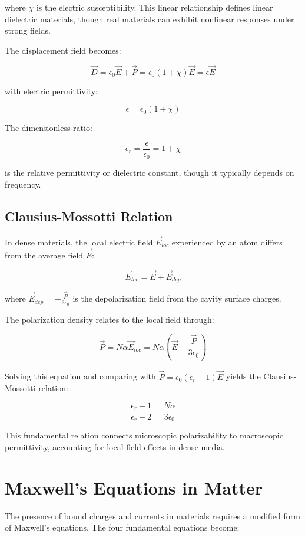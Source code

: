 \documentclass[
  a4paper,
]{book}
\begin{document}
where \(\chi\) is the electric susceptibility. This linear relationship
defines linear dielectric materials, though real materials can exhibit
nonlinear responses under strong fields.

The displacement field becomes:

\[
\vec{D}=\epsilon_0 \vec{E}+\vec{P}=\epsilon_0 (1+\chi)\vec{E}=\epsilon \vec{E}
\]

with electric permittivity:

\[
\epsilon=\epsilon_0 (1+\chi)
\tag{electric permittivity}
\]

The dimensionless ratio:

\[
\epsilon_r=\frac{\epsilon}{\epsilon_0}=1+\chi
\]

is the relative permittivity or dielectric constant, though it typically
depends on frequency.

\subsection{Clausius-Mossotti
Relation}\label{clausius-mossotti-relation}

In dense materials, the local electric field \(\vec{E}_{loc}\)
experienced by an atom differs from the average field \(\vec{E}\):

\[\vec{E}_{loc} = \vec{E} + \vec{E}_{dep}\]

where \(\vec{E}_{dep} = -\frac{\vec{P}}{3\epsilon_0}\) is the
depolarization field from the cavity surface charges.

The polarization density relates to the local field through:

\[\vec{P} = N\alpha \vec{E}_{loc} = N\alpha(\vec{E} - \frac{\vec{P}}{3\epsilon_0})\]

Solving this equation and comparing with
\(\vec{P} = \epsilon_0(\epsilon_r-1)\vec{E}\) yields the
Clausius-Mossotti relation:

\[\frac{\epsilon_r-1}{\epsilon_r+2} = \frac{N\alpha}{3\epsilon_0}\]

This fundamental relation connects microscopic polarizability to
macroscopic permittivity, accounting for local field effects in dense
media.

\section{Maxwell's Equations in
Matter}\label{maxwells-equations-in-matter}

The presence of bound charges and currents in materials requires a
modified form of Maxwell's equations. The four fundamental equations
become:
\end{document}
